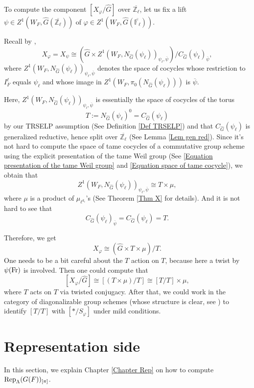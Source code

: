 To compute the component $[X_{\varphi}/\hat{G}]$ over $\overline{\mathbb{Z}_{\ell}}$, let us fix a lift $\psi \in Z^1(W_F, \hat{G}(\overline{\mathbb{Z}_{\ell}}))$ of $\varphi \in Z^1(W_F, \hat{G}(\overline{\mathbb{F}_{\ell}}))$.

Recall by \cite[Subsection 4.6]{dat2022ihes},
$$X_{\varphi}=X_{\psi} \cong \left(\hat{G} \times Z^1(W_F, N_{\hat{G}}(\psi_{\ell}))_{\psi_{\ell}, \overline{\psi}}\right)/C_{\hat{G}}(\psi_{\ell})_{\overline{\psi}},$$
where $Z^1(W_F, N_{\hat{G}}(\psi_{\ell}))_{\psi_{\ell}, \overline{\psi}}$  denotes the space of cocycles whose restriction to $I_F^{\ell}$ equals $\psi_{\ell}$ and whose image in $Z^1(W_F, \pi_0(N_{\hat{G}}(\psi_{\ell})))$ is $\overline{\psi}$. 

Here, $Z^1(W_F, N_{\hat{G}}(\psi_{\ell}))_{\psi_{\ell}, \overline{\psi}}$ is essentially the space of cocycles of the torus $$T:=N_{\hat{G}}(\psi_{\ell})^0=C_{\hat{G}}(\psi_{\ell})$$
by our TRSELP assumption (See Definition \ref{Def TRSELP}) and that $C_{\hat{G}}(\psi_{\ell})$ is generalized reductive, hence split over $\overline{\mathbb{Z}_{\ell}}$ (See Lemma \ref{Lem gen red}). Since it's not hard to compute the space of tame cocycles of a commutative group scheme using the explicit presentation of the tame Weil group (See \ref{Equation presentation of the tame Weil group} and \ref{Equation space of tame cocycle}), we obtain that 
$$Z^1(W_F, N_{\hat{G}}(\psi_{\ell}))_{\psi_{\ell}, \overline{\psi}} \cong T \times \mu,$$
where $\mu$ is a product of $\mu_{\ell^{k_i}}$'s (See Theorem \ref{Thm X} for details).
And it is not hard to see that
$$C_{\hat{G}}(\psi_{\ell})_{\overline{\psi}}=C_{\hat{G}}(\psi_{\ell})=T.$$

Therefore, we get 
$$X_{\varphi} \cong \left(\hat{G} \times T \times \mu\right)/T.$$
One needs to be a bit careful about the $T$ action on $T$, because here a twist by $\psi(\operatorname{Fr})$ is involved. Then one could compute that 
$$[X_{\varphi}/\hat{G}] \cong [\left(T \times \mu\right)/T] \cong [T/T] \times \mu,$$
where $T$ acts on $T$ via twisted conjugacy. After that, we could work in the category of diagonalizable group schemes (whose structure is clear, see \cite[p70, Section 5]{brochard2014autour}) to identify $[T/T]$ with $[*/S_{\varphi}]$ under mild conditions.

\section{Representation side}
In this section, we explain Chapter \ref{Chapter Rep} on how to compute $\operatorname{\operatorname{Rep}}_{\Lambda}(G(F))_{[\pi]}$.

